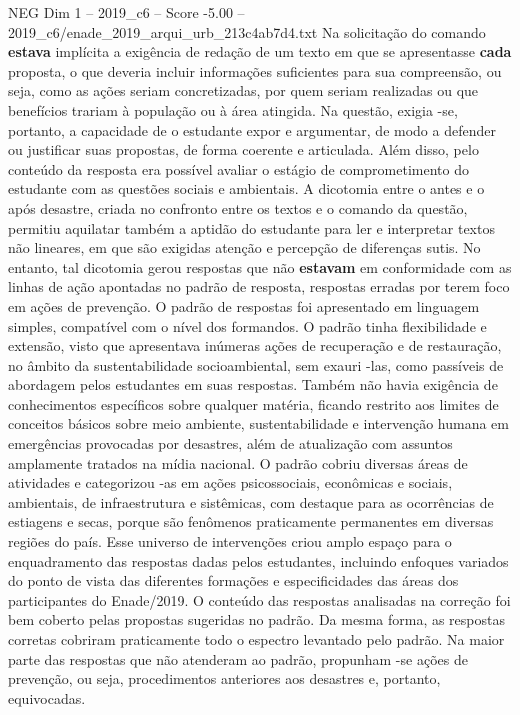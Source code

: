 \begin{textsample}{NEG Dim 1 – 2019\_c6 – Score -5.00 – 2019\_c6/enade\_2019\_arqui\_urb\_213c4ab7d4.txt}
Na solicitação do comando \textbf{estava} implícita a exigência de redação de um texto em que se apresentasse \textbf{cada} proposta, o que deveria incluir informações suficientes para sua compreensão, ou seja, como as ações seriam concretizadas, por quem seriam realizadas ou que benefícios trariam à população ou à área atingida.
Na questão, exigia -se, portanto, a capacidade de o estudante expor e argumentar, de modo a defender ou justificar suas propostas, de forma coerente e articulada.
Além disso, pelo conteúdo da resposta era possível avaliar o estágio de comprometimento do estudante com as questões sociais e ambientais.
A dicotomia entre o antes e o após desastre, criada no confronto entre os textos e o comando da questão, permitiu aquilatar também a aptidão do estudante para ler e interpretar textos não lineares, em que são exigidas atenção e percepção de diferenças sutis.
No entanto, tal dicotomia gerou respostas que não \textbf{estavam} em conformidade com as linhas de ação apontadas no padrão de resposta, respostas erradas por terem foco em ações de prevenção.
O padrão de respostas foi apresentado em linguagem simples, compatível com o nível dos formandos.
O padrão tinha flexibilidade e extensão, visto que apresentava inúmeras ações de recuperação e de restauração, no âmbito da sustentabilidade socioambiental, sem exauri -las, como passíveis de abordagem pelos estudantes em suas respostas.
Também não havia exigência de conhecimentos específicos sobre qualquer matéria, ficando restrito aos limites de conceitos básicos sobre meio ambiente, sustentabilidade e intervenção humana em emergências provocadas por desastres, além de atualização com assuntos amplamente tratados na mídia nacional.
O padrão cobriu diversas áreas de atividades e categorizou -as em ações psicossociais, econômicas e sociais, ambientais, de infraestrutura e sistêmicas, com destaque para as ocorrências de estiagens e secas, porque são fenômenos praticamente permanentes em diversas regiões do país.
Esse universo de intervenções criou amplo espaço para o enquadramento das respostas dadas pelos estudantes, incluindo enfoques variados do ponto de vista das diferentes formações e especificidades das áreas dos participantes do Enade/2019.
O conteúdo das respostas analisadas na correção foi bem coberto pelas propostas sugeridas no padrão.
Da mesma forma, as respostas corretas cobriram praticamente todo o espectro levantado pelo padrão.
Na maior parte das respostas que não atenderam ao padrão, propunham -se ações de prevenção, ou seja, procedimentos anteriores aos desastres e, portanto, equivocadas.

\end{textsample}
